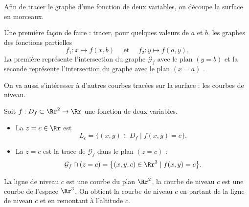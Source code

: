 \documentclass[11pt, class=report,crop=false]{standalone}
\begin{document}
Afin de tracer le graphe d'une fonction de deux variables, on découpe la surface en morceaux.


\bigskip


Une première façon de faire : tracer, pour quelques valeurs de $a$ et $b$, les graphes des fonctions partielles
$$f_1:x\mapsto f(x,b) \quad \text{ et } \quad f_2:y\mapsto f(a,y).$$
La première représente l'intersection du graphe $\mathcal{G}_f$ avec le plan $(y=b)$  et la seconde représente l'intersection du graphe avec le plan $(x=a)$ .



\bigskip


On va aussi s'intéresser à d'autres courbes tracées sur la surface : les courbes de niveau.


\begin{definition}

Soit $f : D_f \subset \Rr^2 \to \Rr$ une fonction de deux variables. 
\begin{itemize}
  \item La  
$z=c\in \Rr$ est 
$$L_c =\big\{(x,y)\in D_f \mid f(x,y)=c \big\}.$$
  \item La  $z=c$ est la trace de $\mathcal{G}_f$ dans le plan $(z=c)$ : 
$$\mathcal{G}_f \cap (z=c) = \big\{ (x,y,c)\in \Rr^3 \mid f(x,y)=c \big\}.$$
\end{itemize}
\end{definition}


La ligne de niveau $c$ est une courbe du plan $\Rr^2$, la courbe de niveau $c$
est une courbe de l'espace $\Rr^3$. On obtient la courbe de niveau $c$ en partant de la ligne de niveau $c$ et en remontant à l'altitude $c$.
\end{document}
